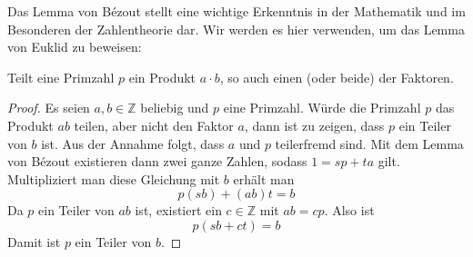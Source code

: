 Das Lemma von Bézout stellt eine wichtige Erkenntnis in der Mathematik und im Besonderen der Zahlentheorie dar. Wir werden es hier verwenden, um das Lemma von Euklid zu beweisen:

\begin{lemma}
Teilt eine Primzahl $p$ ein Produkt $a\cdot b$, so auch einen (oder beide) der Faktoren.
\end{lemma}
\begin{proof}
Es seien $a,b \in \mathbb{Z}$ beliebig und $p$ eine Primzahl. Würde die Primzahl $p$ das Produkt $ab$ teilen, aber nicht den Faktor $a$, dann ist zu zeigen, dass $p$ ein Teiler von $b$ ist. Aus der Annahme folgt, dass $a$ und $p$ teilerfremd sind. Mit dem Lemma von Bézout existieren dann zwei ganze Zahlen, sodass $1=sp+ta$ gilt. Multipliziert man diese Gleichung mit $b$ erhält man
\[
p(sb)+(ab)t=b
\]
Da $p$ ein Teiler von $ab$ ist, existiert ein $c\in \mathbb{Z}$ mit $ab=cp$. Also ist
\[
p(sb+ct) = b
\]
Damit ist $p$ ein Teiler von $b$.
\end{proof}

